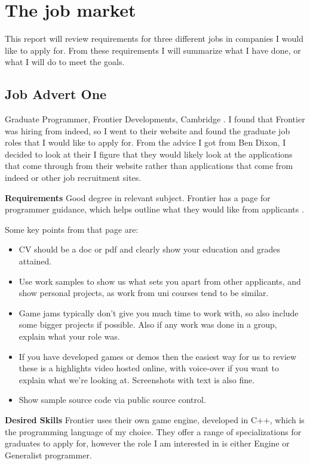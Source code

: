 \documentclass{scrartcl}
\begin{document}
\section{The job market}
This report will review requirements for three different jobs in companies I would like to apply for. From these requirements I will summarize what I have done, or what I will do to meet the goals. 


\subsection{Job Advert One}
Graduate Programmer, Frontier Developments, Cambridge  \cite{JobOne}. 
I found that Frontier was hiring from indeed, so I went to their website and found the graduate job roles that I would like to apply for.
From the advice I got from Ben Dixon, I decided to look at their
I figure that they would likely look at the applications that come through from their website rather than applications that come from indeed or other job recruitment sites.



\textbf{Requirements}
Good degree in relevant subject.
 Frontier has a page for programmer guidance, which helps outline what they would like from applicants \cite{FrontierAdvice}.

Some key points from that page are:
\begin{itemize}
	\item CV should be a doc or pdf and clearly show your education and grades attained.
	\item Use work samples to show us what sets you apart from other applicants, and show personal projects, as work from uni courses tend to be similar.
	\item Game jams typically don't give you much time to work with, so also include some bigger projects if possible. Also if any work was done in a group, explain what your role was.
	\item If you have developed games or demos then the easiest way for us to review these is a highlights video hosted online, with voice-over if you want to explain what we're looking at. Screenshots with text is also fine.
	\item Show sample source code via public source control.
\end{itemize}


\textbf{Desired Skills}
Frontier uses their own game engine, developed in C++, which is the programming language of my choice.
They offer a range of specializations for graduates to apply for, however the role I am interested in is either Engine or Generalist programmer.
\end{document}
